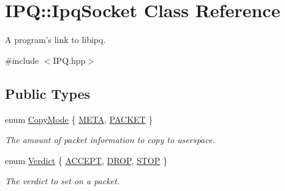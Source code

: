 \hypertarget{classIPQ_1_1IpqSocket}{
\section{\-I\-P\-Q\-:\-:\-Ipq\-Socket \-Class \-Reference}
\label{classIPQ_1_1IpqSocket}
}


\-A program's link to libipq.  




{\ttfamily \#include $<$\-I\-P\-Q.\-hpp$>$}

\subsection*{\-Public \-Types}
\begin{DoxyCompactItemize}
\item 
enum \hyperlink{classIPQ_1_1IpqSocket_afee6d75480079906ecf6544f8467e0cc}{\-Copy\-Mode} \{ \hyperlink{classIPQ_1_1IpqSocket_afee6d75480079906ecf6544f8467e0cca68b0f4a778230f9a60087417daa76310}{\-M\-E\-T\-A}, 
\hyperlink{classIPQ_1_1IpqSocket_afee6d75480079906ecf6544f8467e0ccafc1e90369658a807b2c970d3e15b01d4}{\-P\-A\-C\-K\-E\-T}
 \}
\begin{DoxyCompactList}\small\item\em \-The amount of packet information to copy to userspace. \end{DoxyCompactList}\item 
enum \hyperlink{classIPQ_1_1IpqSocket_a2aaaf01ab3bdb3a4a7f90dd142fd93cc}{\-Verdict} \{ \hyperlink{classIPQ_1_1IpqSocket_a2aaaf01ab3bdb3a4a7f90dd142fd93cca2f14f71dc344cea511b9a9e7a553ed99}{\-A\-C\-C\-E\-P\-T}, 
\hyperlink{classIPQ_1_1IpqSocket_a2aaaf01ab3bdb3a4a7f90dd142fd93cca95ff3c260279df28c833d51ffa1b8c46}{\-D\-R\-O\-P}, 
\hyperlink{classIPQ_1_1IpqSocket_a2aaaf01ab3bdb3a4a7f90dd142fd93cca2de248ccae41d7a288cda6a629ecdcf5}{\-S\-T\-O\-P}
 \}
\begin{DoxyCompactList}\small\item\em \-The verdict to set on a packet. \end{DoxyCompactList}\end{DoxyCompactItemize}
